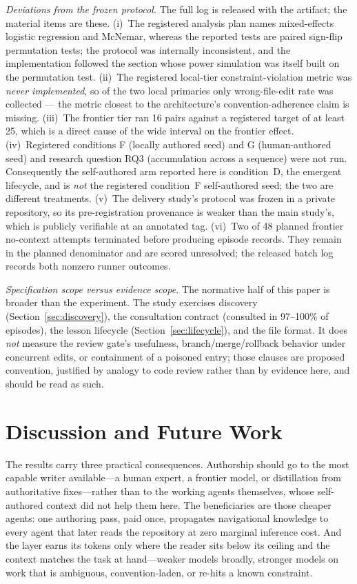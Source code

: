 \documentclass[sigconf,screen]{acmart}
\begin{document}
\emph{Deviations from the frozen protocol.} The full log is released with the
artifact; the material items are these. (i)~The registered analysis plan names
mixed-effects logistic regression and McNemar, whereas the reported tests are
paired sign-flip permutation tests; the protocol was internally inconsistent, and
the implementation followed the section whose power simulation was itself built
on the permutation test. (ii)~The registered local-tier constraint-violation
metric was \emph{never implemented}, so of the two local primaries only
wrong-file-edit rate was collected --- the metric closest to the architecture's
convention-adherence claim is missing. (iii)~The frontier tier ran 16 pairs
against a registered target of at least 25, which is a direct cause of the wide
interval on the frontier effect. (iv)~Registered conditions F (locally authored
seed) and G (human-authored seed) and research question RQ3 (accumulation across
a sequence) were not run. Consequently the self-authored arm reported here is
condition~D, the emergent lifecycle, and is \emph{not} the registered condition~F
self-authored seed; the two are different treatments. (v)~The delivery study's
protocol was frozen in a private repository, so its pre-registration provenance
is weaker than the main study's, which is publicly verifiable at an annotated tag.
(vi)~Two of 48 planned frontier no-context attempts terminated before producing
episode records. They remain in the planned denominator and are scored unresolved;
the released batch log records both nonzero runner outcomes.

\emph{Specification scope versus evidence scope.} The normative half of this paper
is broader than the experiment. The study exercises discovery
(Section~\ref{sec:discovery}), the consultation contract (consulted in 97--100\% of
episodes), the lesson lifecycle (Section~\ref{sec:lifecycle}), and the file format.
It does \emph{not} measure the review gate's usefulness, branch/merge/rollback
behavior under concurrent edits, or containment of a poisoned entry; those clauses
are proposed convention, justified by analogy to code review rather than by
evidence here, and should be read as such.

\section{Discussion and Future Work}
The results carry three practical consequences. Authorship should go to the most
capable writer available---a human expert, a frontier model, or distillation from
authoritative fixes---rather than to the working agents themselves, whose
self-authored context did not help them here. The beneficiaries are those cheaper agents: one authoring
pass, paid once, propagates navigational knowledge to every agent that later reads
the repository at zero marginal inference cost. And the layer earns its tokens only
where the reader sits below its ceiling and the context matches the task at
hand---weaker models broadly, stronger models on work that is ambiguous,
convention-laden, or re-hits a known constraint.
\end{document}
